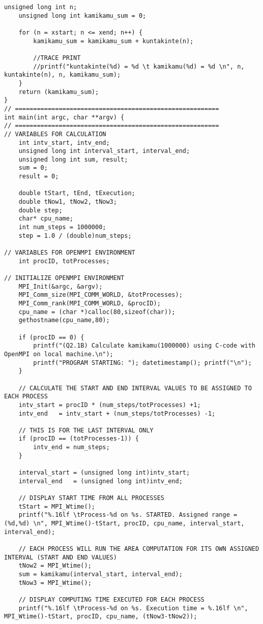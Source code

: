 \begin{lstlisting}[caption={App4-C++-MPI Example Parallel Multiprocessing}, label=App4-C++-MPI Example Parallel Multiprocessing]
	unsigned long int n; 
	unsigned long int kamikamu_sum = 0;

	for (n = xstart; n <= xend; n++) {
		kamikamu_sum = kamikamu_sum + kuntakinte(n);

		//TRACE PRINT
		//printf("kuntakinte(%d) = %d \t kamikamu(%d) = %d \n", n, kuntakinte(n), n, kamikamu_sum); 
	}    
	return (kamikamu_sum);
}
// ========================================================
int main(int argc, char **argv) {
// ========================================================
// VARIABLES FOR CALCULATION
	int intv_start, intv_end;
	unsigned long int interval_start, interval_end;
	unsigned long int sum, result;
	sum = 0;
	result = 0;
	
	double tStart, tEnd, tExecution;
	double tNow1, tNow2, tNow3;
	double step;
	char* cpu_name;
	int num_steps = 1000000;
	step = 1.0 / (double)num_steps;

// VARIABLES FOR OPENMPI ENVIRONMENT
	int procID, totProcesses;

// INITIALIZE OPENMPI ENVIRONMENT
	MPI_Init(&argc, &argv);
	MPI_Comm_size(MPI_COMM_WORLD, &totProcesses);
	MPI_Comm_rank(MPI_COMM_WORLD, &procID);
	cpu_name = (char *)calloc(80,sizeof(char));
	gethostname(cpu_name,80);

	if (procID == 0) {
		printf("(Q2.1B) Calculate kamikamu(1000000) using C-code with OpenMPI on local machine.\n");
		printf("PROGRAM STARTING: "); datetimestamp(); printf("\n");
	}

	// CALCULATE THE START AND END INTERVAL VALUES TO BE ASSIGNED TO EACH PROCESS
	intv_start = procID * (num_steps/totProcesses) +1;
	intv_end   = intv_start + (num_steps/totProcesses) -1;
	
	// THIS IS FOR THE LAST INTERVAL ONLY
	if (procID == (totProcesses-1)) {
		intv_end = num_steps;
	}

	interval_start = (unsigned long int)intv_start;
	interval_end   = (unsigned long int)intv_end;

	// DISPLAY START TIME FROM ALL PROCESSES
	tStart = MPI_Wtime();
	printf("%.16lf \tProcess-%d on %s. STARTED. Assigned range = (%d,%d) \n", MPI_Wtime()-tStart, procID, cpu_name, interval_start, interval_end);

	// EACH PROCESS WILL RUN THE AREA COMPUTATION FOR ITS OWN ASSIGNED INTERVAL (START AND END VALUES)
	tNow2 = MPI_Wtime();
	sum = kamikamu(interval_start, interval_end);
	tNow3 = MPI_Wtime();

	// DISPLAY COMPUTING TIME EXECUTED FOR EACH PROCESS
	printf("%.16lf \tProcess-%d on %s. Execution time = %.16lf \n", MPI_Wtime()-tStart, procID, cpu_name, (tNow3-tNow2));


\end{lstlisting}
